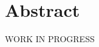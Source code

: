 \documentclass[../../DD.tex]{subfiles}
\begin{document}
\section{Abstract}
WORK IN PROGRESS
\end{document}
